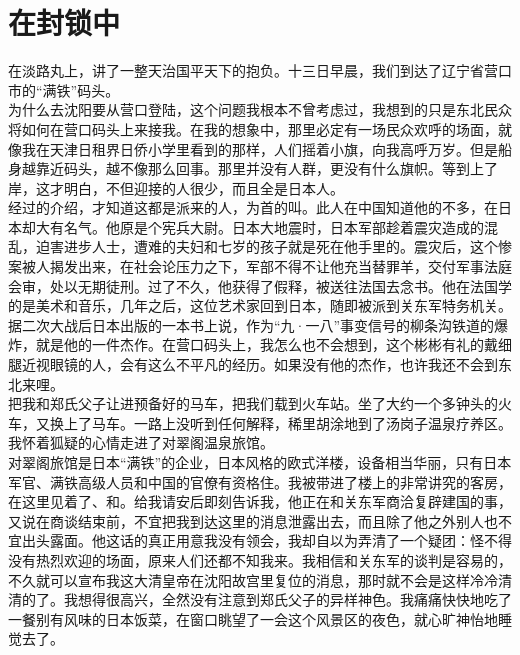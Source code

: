 \fancyhead[RO]{\thepage} %
\fancyhead[LE]{\thepage} %
\chapter*{在封锁中}
在淡路丸上，讲了一整天治国平天下的抱负。十三日早晨，我们到达了辽宁省营口市的“满铁”码头。\\

为什么去沈阳要从营口登陆，这个问题我根本不曾考虑过，我想到的只是东北民众将如何在营口码头上来接我。在我的想象中，那里必定有一场民众欢呼的场面，就像我在天津日租界日侨小学里看到的那样，人们摇着小旗，向我高呼万岁。但是船身越靠近码头，越不像那么回事。那里并没有人群，更没有什么旗帜。等到上了岸，这才明白，不但迎接的人很少，而且全是日本人。\\

经过的介绍，才知道这都是派来的人，为首的叫。此人在中国知道他的不多，在日本却大有名气。他原是个宪兵大尉。日本大地震时，日本军部趁着震灾造成的混乱，迫害进步人士，遭难的夫妇和七岁的孩子就是死在他手里的。震灾后，这个惨案被人揭发出来，在社会论压力之下，军部不得不让他充当替罪羊，交付军事法庭会审，处以无期徒刑。过了不久，他获得了假释，被送往法国去念书。他在法国学的是美术和音乐，几年之后，这位艺术家回到日本，随即被派到关东军特务机关。据二次大战后日本出版的一本书上说，作为“九·一八”事变信号的柳条沟铁道的爆炸，就是他的一件杰作。在营口码头上，我怎么也不会想到，这个彬彬有礼的戴细腿近视眼镜的人，会有这么不平凡的经历。如果没有他的杰作，也许我还不会到东北来哩。\\

把我和郑氏父子让进预备好的马车，把我们载到火车站。坐了大约一个多钟头的火车，又换上了马车。一路上没听到任何解释，稀里胡涂地到了汤岗子温泉疗养区。我怀着狐疑的心情走进了对翠阁温泉旅馆。\\

对翠阁旅馆是日本“满铁”的企业，日本风格的欧式洋楼，设备相当华丽，只有日本军官、满铁高级人员和中国的官僚有资格住。我被带进了楼上的非常讲究的客房，在这里见着了、和。给我请安后即刻告诉我，他正在和关东军商洽复辟建国的事，又说在商谈结束前，不宜把我到达这里的消息泄露出去，而且除了他之外别人也不宜出头露面。他这话的真正用意我没有领会，我却自以为弄清了一个疑团：怪不得没有热烈欢迎的场面，原来人们还都不知我来。我相信和关东军的谈判是容易的，不久就可以宣布我这大清皇帝在沈阳故宫里复位的消息，那时就不会是这样冷冷清清的了。我想得很高兴，全然没有注意到郑氏父子的异样神色。我痛痛快快地吃了一餐别有风味的日本饭菜，在窗口眺望了一会这个风景区的夜色，就心旷神怡地睡觉去了。\\


